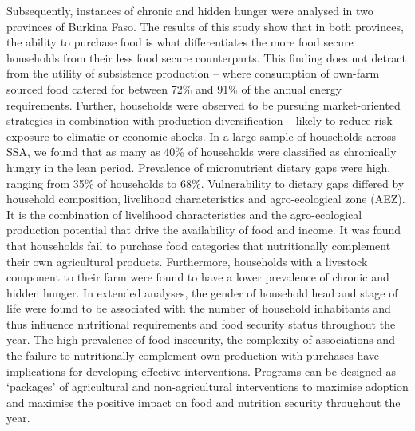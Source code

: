 Subsequently, instances of chronic and hidden hunger were analysed in two provinces of Burkina Faso. The results of this study show that in both provinces, the ability to purchase food is what differentiates the more food secure households from their less food secure counterparts. This finding does not detract from the utility of subsistence production -- where consumption of own-farm sourced food catered for between 72\% and 91\% of the annual energy requirements. Further, households were observed to be pursuing market-oriented strategies in combination with production diversification -- likely to reduce risk exposure to climatic or economic shocks.
In a large sample of households across SSA, we found that as many as 40\% of households were classified as chronically hungry in the lean period. Prevalence of micronutrient dietary gaps were high, ranging from 35\% of households to 68\%. Vulnerability to dietary gaps differed by household composition, livelihood characteristics and agro-ecological zone (AEZ). It is the combination of livelihood characteristics and the agro-ecological production potential that drive the availability of food and income. It was found that households fail to purchase food categories that nutritionally complement their own agricultural products. Furthermore, households with a livestock component to their farm were found to have a lower prevalence of chronic and hidden hunger.
In extended analyses, the gender of household head and stage of life were found to be associated with the number of household inhabitants and thus influence nutritional requirements and food security status throughout the year. The high prevalence of food insecurity, the complexity of associations and the failure to nutritionally complement own-production with purchases have implications for developing effective interventions. Programs can be designed as `packages' of agricultural and non-agricultural interventions to maximise adoption and maximise the positive impact on food and nutrition security throughout the year.

\normalsize
